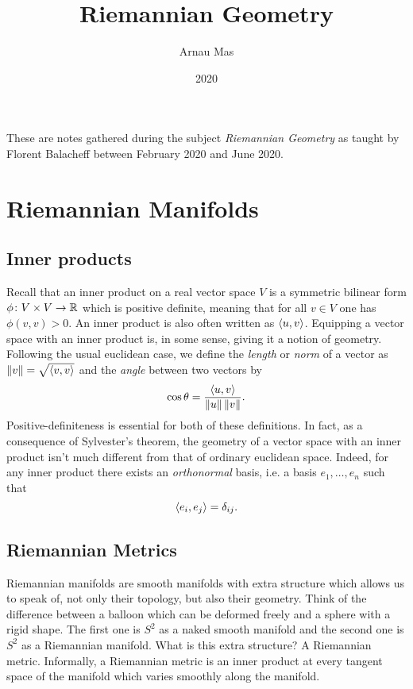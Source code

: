 \documentclass[12pt,twoside]{book}
\title{Riemannian Geometry}
\author{Arnau Mas}
\date{2020}
\begin{document}
\maketitle

\frontmatter
\pagestyle{plain}
These are notes gathered during the subject \emph{Riemannian Geometry} as taught by
Florent Balacheff between February 2020 and June 2020.

\mainmatter
\chapter{Riemannian Manifolds}
\section{Inner products}
Recall that an inner product on a real vector space \( V \) is a symmetric bilinear form
\( \phi \colon V \times V \to \mathbb{R} \) which is positive definite, meaning that for all \( v
\in V \) one has \( \phi(v,v) > 0 \). An inner product is also often written as \(
\langle u, v \rangle \). Equipping a vector space with an inner product is, in some sense, giving it
a notion of geometry. Following the usual euclidean case, we define the \emph{length} or
\emph{norm} of a vector as \( \left\lVert v \right\rVert = \sqrt{\langle v, v \rangle} \) and the \emph{angle} between
two vectors by 
\begin{equation*}
	\cos{\theta} = \frac{\langle u, v \rangle}{\left\lVert u \right\rVert\left\lVert v \right\rVert}.
\end{equation*}
Positive-definiteness is essential for both of these definitions. In fact, as a
consequence of Sylvester's theorem, the geometry of a vector space with an
inner product isn't much different from that of ordinary euclidean space. Indeed,
for any inner product there exists an \emph{orthonormal} basis, i.e. a basis \( e_1,
\dots, e_n \) such that
\begin{equation*}
	\langle e_i, e_j \rangle = \delta_{ij}.
\end{equation*}

\section{Riemannian Metrics}
Riemannian manifolds are smooth manifolds with extra structure which allows us to speak
of, not only their topology, but also their geometry. Think of the difference between a
balloon which can be deformed freely and a sphere with a rigid shape. The first one is \(
S^2 \) as a naked smooth manifold and the second one is \( S^2 \) as a Riemannian
manifold. What is this extra structure? A Riemannian metric. Informally, a Riemannian
metric is an inner product at every tangent space of the manifold which varies smoothly
along the manifold. 
\end{document}
